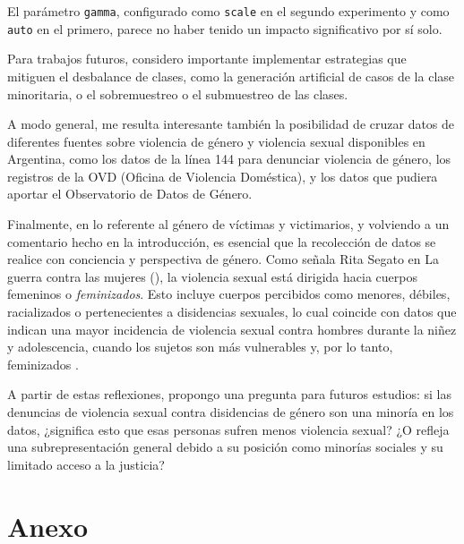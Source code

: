 \documentclass[10 pt]{article}
\begin{document}
El parámetro \texttt{gamma}, configurado como \texttt{scale} en el segundo experimento y como \texttt{auto} en el primero, parece no haber tenido un impacto significativo por sí solo.

Para trabajos futuros, considero importante implementar estrategias que mitiguen el desbalance de clases, como la generación artificial de casos de la clase minoritaria, o el sobremuestreo o el submuestreo de las clases.

A modo general, me resulta interesante también la posibilidad de cruzar datos de diferentes fuentes sobre violencia de género y violencia sexual disponibles en Argentina, como los datos de la línea 144 para denunciar violencia de género, los registros de la OVD (Oficina de Violencia Doméstica), y los datos que pudiera aportar el Observatorio de Datos de Género. 

Finalmente, en lo referente al género de víctimas y victimarios, y volviendo a un comentario hecho en la introducción, es esencial que la recolección de datos se realice con conciencia y perspectiva de género. Como señala Rita Segato en La guerra contra las mujeres (\citeyear{segato2016guerra}), la violencia sexual está dirigida hacia cuerpos femeninos o \textit{feminizados}. Esto incluye cuerpos percibidos como menores, débiles, racializados o pertenecientes a disidencias sexuales, lo cual coincide con datos que indican una mayor incidencia de violencia sexual contra hombres durante la niñez y adolescencia, cuando los sujetos son más vulnerables y, por lo tanto, feminizados \citep{contreras2016violencia,ufem_relevamiento,ferris2002world}.

A partir de estas reflexiones, propongo una pregunta para futuros estudios: si las denuncias de violencia sexual contra disidencias de género son una minoría en los datos, ¿significa esto que esas personas sufren menos violencia sexual? ¿O refleja una subrepresentación general debido a su posición como minorías sociales y su limitado acceso a la justicia?


\newpage




\newpage
\section{Anexo}\label{anex}
\end{document}
